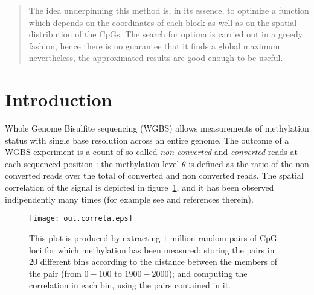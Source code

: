 \documentclass[12pt]{amsart}
\newcommand{\ie}{\textit{i.e.}}
\begin{document}
\begin{abstract}
The idea underpinning this method is, in its essence, to optimize  
a function which depends on the coordinates
of each block as well as on the spatial distribution of the CpGs.
The search for optima is carried out
in a greedy fashion, hence there is no guarantee
that it finds a global maximum: nevertheless, the approximated results 
are good enough to be useful.
\end{abstract}

\section{Introduction}

Whole Genome Bisulfite sequencing (WGBS) allows measurements of methylation 
status with single base resolution across an entire genome. The outcome
of a WGBS experiment is a count of so called {\it non converted} and {\it converted} 
reads at each 
sequenced position : the methylation level $\theta$ is defined
as the ratio of the non converted reads over the total of converted and 
non converted reads.
The spatial correlation of the signal is depicted in figure~\ref{fig_corr},
and it has been observed indipendently many times (for example
see \cite{bsmooth} and references therein).

\begin{center}
\begin{figure}\label{fig_corr}
\texttt{[image: out.correla.eps]}
\caption{This plot is produced by extracting $1$ million random pairs of CpG loci
for which methylation has been measured;
storing the pairs in $20$ different bins  according to the distance between 
the members of the pair (from $0-100$ to $1900-2000$); and computing the 
correlation in each bin, using the pairs contained in it.}
\end{figure}
\end{center}
 
\end{document}

